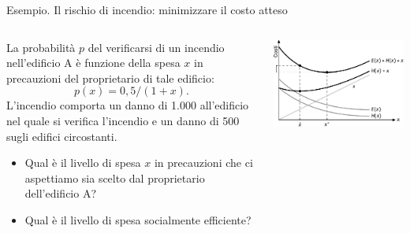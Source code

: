 \documentclass[aspectratio=64,12pt]{beamer}
\begin{document}
\begin{frame}{Esempio. Il rischio di incendio: minimizzare il costo atteso}
\begin{columns}
\begin{column}{.5\columnwidth}
La probabilità $p$ del verificarsi di un incendio nell'edificio A è funzione
della spesa $x$ in precauzioni del proprietario di tale edificio:
$$p(x) = 0,5/(1 + x).$$
L’incendio comporta un danno di 1.000 all'edificio
nel quale si verifica l'incendio e un danno di 500 sugli
edifici circostanti.
\begin{itemize}
\item Qual è il livello di spesa $x$ in precauzioni che ci aspettiamo sia scelto
dal proprietario dell'edificio A?
\item Qual è il livello di spesa socialmente efficiente?
\end{itemize}
\end{column}
\begin{column}{.5\columnwidth}
\begin{center}
\includegraphics[width=\textwidth]{./figure/esternalita-precauzioni.pdf}
\end{center}
\end{column}
\end{columns}
\end{frame}
\end{document}
